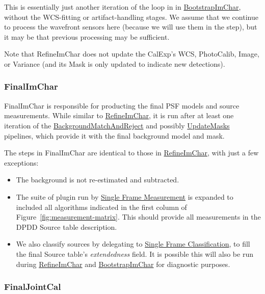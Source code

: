This is essentially just another iteration of the loop in in \hyperref[sec:drpBootstrapImChar]{BootstrapImChar}, without the WCS-fitting or artifact-handling stages.  We assume that we continue to process the wavefront sensors here (because we will use them in the  step), but it may be that previous processing may be sufficient.

Note that RefineImChar does not update the CalExp's WCS, PhotoCalib, Image, or Variance (and its Mask is only updated to indicate new detections).


\let\hr\undefined

\subsubsection{FinalImChar}
\label{sec:drpFinalImChar}

FinalImChar is responsible for producting the final PSF models and source measurements.  While similar to \hyperref[sec:drpRefineImChar]{RefineImChar}, it is run after at least one iteration of the \hyperref[sec:drpBackgroundMatchAndReject]{BackgroundMatchAndReject} and possibly \hyperref[sec:drpUpdateMasks]{UpdateMasks} pipelines, which provide it with the final background model and mask.

The steps in FinalImChar are identical to those in \hyperref[sec:drpRefineImChar]{RefineImChar}, with just a few exceptions:

\begin{itemize}
\item The background is not re-estimated and subtracted.
\item The suite of plugin run by \hyperref[sec:acSingleFrameMeasurement]{Single Frame Measurement} is expanded to included all algorithms indicated in the first column of Figure~\ref{fig:measurement-matrix}.  This should provide all measurements in the DPDD Source table description.
\item We also classify sources by delegating to \hyperref[sec:acSingleFrameClassification]{Single Frame Classification}, to fill the final Source table's \emph{extendedness} field.  It is possible this will also be run during \hyperref[sec:drpRefineImChar]{RefineImChar} and \hyperref[sec:drpBootstrapImChar]{BootstrapImChar} for diagnostic purposes.
\end{itemize}

\subsubsection{FinalJointCal}
\label{sec:drpFinalJointCal}

